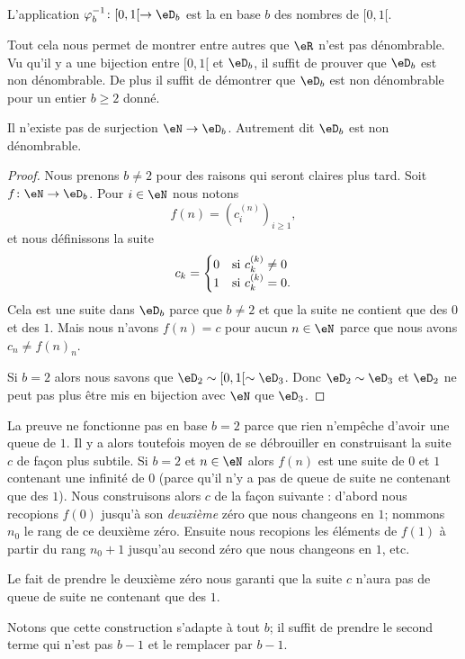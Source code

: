 L'application \( \varphi_b^{-1}\colon \mathopen[ 0 , 1 [\to \eD_b\) est la  en base \( b\) des nombres de \( \mathopen[ 0 , 1 [\).

Tout cela nous permet de montrer entre autres que \( \eR\) n'est pas dénombrable. Vu qu'il y a une bijection entre \( \mathopen[ 0 , 1 [\) et \( \eD_b\), il suffit de prouver que \( \eD_b\) est non dénombrable. De plus il suffit de démontrer que \( \eD_b\) est non dénombrable pour un entier \( b\geq 2\) donné.

\begin{proposition}  \label{PropNNHooYTVFw} 
    Il n'existe pas de surjection \( \eN\to \eD_b\). Autrement dit \( \eD_b\) est non dénombrable.
\end{proposition}

\begin{proof}
    Nous prenons \( b\neq 2\) pour des raisons qui seront claires plus tard. Soit \( f\colon \eN\to \eD_b\). Pour \( i\in \eN\) nous notons 
    \begin{equation}
        f(n)=(c_i^{(n)})_{i\geq 1},
    \end{equation}
    et nous définissons la suite
    \begin{equation}
        c_k=\begin{cases}
            0    &   \text{si \( c_k^{(k)}\neq 0\)}\\
            1    &    \text{si \( c_k^{(k)}=0\)}.
        \end{cases}
    \end{equation}
    Cela est une suite dans \( \eD_b\) parce que \( b\neq 2\) et que la suite ne contient que des \( 0\) et des \( 1\). Mais nous n'avons \( f(n)=c\) pour aucun \( n\in \eN\) parce que nous avons \( c_n\neq f(n)_n\).

    Si \( b=2\) alors nous savons que \( \eD_2\sim\mathopen[ 0 , 1 [\sim \eD_3\). Donc \( \eD_2\sim \eD_3\) et \( \eD_2\) ne peut pas plus être mis en bijection avec \( \eN\) que \( \eD_3\).
\end{proof}
\begin{remark}
    La preuve ne fonctionne pas en base \( b=2\) parce que rien n'empêche d'avoir une queue de \( 1\). Il y a alors toutefois moyen de se débrouiller en construisant la suite \( c\) de façon plus subtile. Si \( b=2\) et \( n\in \eN\) alors \( f(n)\) est une suite de \( 0\) et \( 1\) contenant une infinité de \( 0\) (parce qu'il n'y a pas de queue de suite ne contenant que des \( 1\)). Nous construisons alors \( c\) de la façon suivante : d'abord nous recopions \( f(0)\) jusqu'à son \emph{deuxième} zéro que nous changeons en \( 1\); nommons \( n_0\) le rang de ce deuxième zéro. Ensuite nous recopions les éléments de \( f(1) \) à partir du rang \( n_0+1\) jusqu'au second zéro que nous changeons en \( 1\), etc.

    Le fait de prendre le deuxième zéro nous garanti que la suite \( c\) n'aura pas de queue de suite ne contenant que des \( 1\).

    Notons que cette construction s'adapte à tout \( b\); il suffit de prendre le second terme qui n'est pas \( b-1\) et le remplacer par \( b-1\).
\end{remark}

